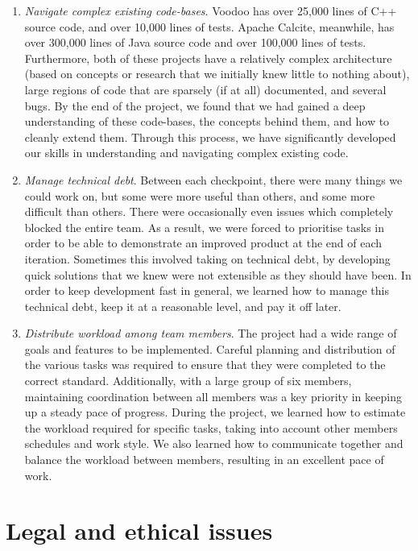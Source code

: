 \begin{enumerate}
    \item \emph{Navigate complex existing code-bases}. Voodoo has over 25,000 lines of C++ source code, and over 10,000 lines of tests. Apache Calcite, meanwhile, has over 300,000 lines of Java source code and over 100,000 lines of tests. Furthermore, both of these projects have a relatively complex architecture (based on concepts or research that we initially knew little to nothing about), large regions of code that are sparsely (if at all) documented, and several bugs. By the end of the project, we found that we had gained a deep understanding of these code-bases, the concepts behind them, and how to cleanly extend them. Through this process, we have significantly developed our skills in understanding and navigating complex existing code.
    
    \item \emph{Manage technical debt}. Between each checkpoint, there were many things we could work on, but some were more useful than others, and some more difficult than others. There were occasionally even issues which completely blocked the entire team. As a result, we were forced to prioritise tasks in order to be able to demonstrate an improved product at the end of each iteration. Sometimes this involved taking on technical debt, by developing quick solutions that we knew were not extensible as they should have been. In order to keep development fast in general, we learned how to manage this technical debt, keep it at a reasonable level, and pay it off later.
    
    \item \emph{Distribute workload among team members}. The project had a wide range of goals and features to be implemented. Careful planning and distribution of the various tasks was required to ensure that they were completed to the correct standard. Additionally, with a large group of six members, maintaining coordination between all members was a key priority in keeping up a steady pace of progress. During the project, we learned how to estimate the workload required for specific tasks, taking into account other members schedules and work style. We also learned how to communicate together and balance the workload between members, resulting in an excellent pace of work. 
    
\end{enumerate}

\section{Legal and ethical issues}

